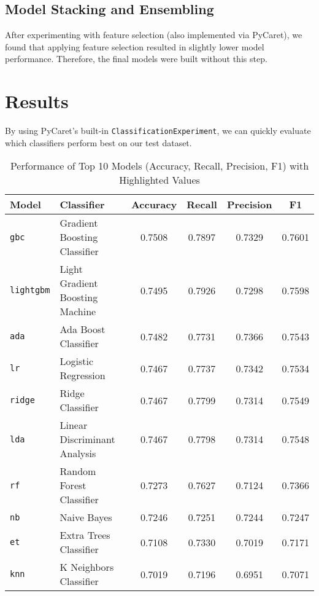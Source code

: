 \documentclass[a4paper,12pt]{article}
\begin{document}
\subsection{Model Stacking and Ensembling}
After experimenting with feature selection (also implemented via PyCaret), we found that applying 
feature selection resulted in slightly lower model performance. Therefore, the final models were 
built without this step.

\section{Results}
By using PyCaret's built-in \texttt{ClassificationExperiment}, we can quickly evaluate which classifiers perform best on our test dataset.

\begin{table}[h!]
\centering
\begin{tabular}{l l c c c c}
\toprule
\textbf{Model} & \textbf{Classifier} & \textbf{Accuracy} & \textbf{Recall} & \textbf{Precision} & \textbf{F1} \\
\midrule
\texttt{gbc} & Gradient Boosting Classifier & \cellcolor{yellow}0.7508 & 0.7897 & 0.7329 & \cellcolor{yellow}0.7601 \\
\texttt{lightgbm} & Light Gradient Boosting Machine & 0.7495 & \cellcolor{yellow}0.7926 & 0.7298 & 0.7598 \\
\texttt{ada} & Ada Boost Classifier & 0.7482 & 0.7731 & \cellcolor{yellow}0.7366 & 0.7543 \\
\texttt{lr} & Logistic Regression & 0.7467 & 0.7737 & 0.7342 & 0.7534 \\
\texttt{ridge} & Ridge Classifier & 0.7467 & 0.7799 & 0.7314 & 0.7549 \\
\texttt{lda} & Linear Discriminant Analysis & 0.7467 & 0.7798 & 0.7314 & 0.7548 \\
\texttt{rf} & Random Forest Classifier & 0.7273 & 0.7627 & 0.7124 & 0.7366 \\
\texttt{nb} & Naive Bayes & 0.7246 & 0.7251 & 0.7244 & 0.7247 \\
\texttt{et} & Extra Trees Classifier & 0.7108 & 0.7330 & 0.7019 & 0.7171 \\
\texttt{knn} & K Neighbors Classifier & 0.7019 & 0.7196 & 0.6951 & 0.7071 \\
\bottomrule
\end{tabular}
\caption{Performance of Top 10 Models (Accuracy, Recall, Precision, F1) with Highlighted Values}
\label{tab:model_performance}
\end{table}
\end{document}
